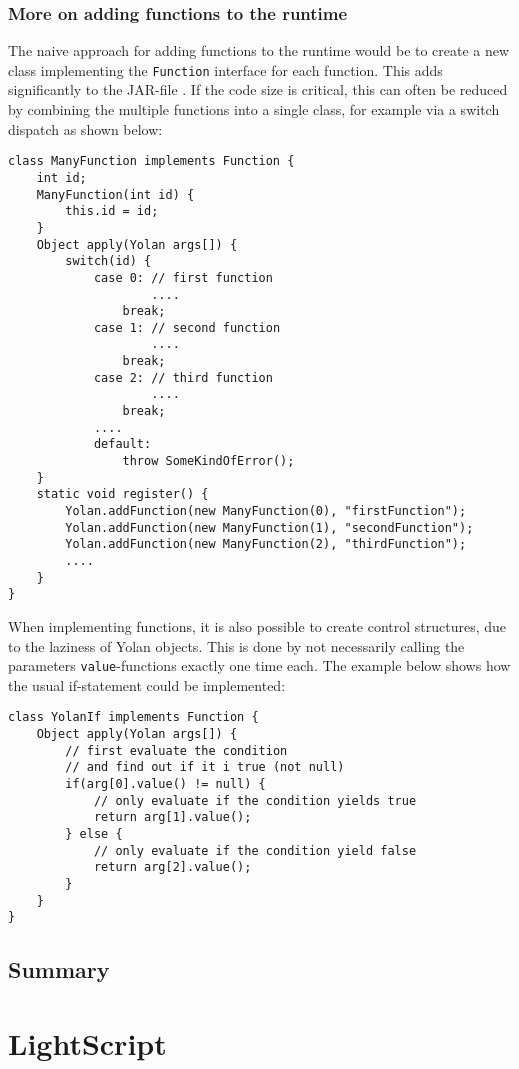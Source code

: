 \documentclass[11pt]{report}
\begin{document}
\subsection{More on adding functions to the runtime}
The naive approach for adding functions to the runtime would be to create a new class implementing the \verb|Function| interface for each function. This adds significantly to the JAR-file
.
If the code size is critical, this can often be reduced by combining the multiple functions into a single class, for example via a switch dispatch as shown below:
\begin{lstlisting}
class ManyFunction implements Function {
    int id;
    ManyFunction(int id) {
        this.id = id;
    }
    Object apply(Yolan args[]) {
        switch(id) {
            case 0: // first function
                    ....
                break;
            case 1: // second function
                    ....
                break;
            case 2: // third function
                    ....
                break;
            ....
            default:
                throw SomeKindOfError();
    }
    static void register() {
        Yolan.addFunction(new ManyFunction(0), "firstFunction");
        Yolan.addFunction(new ManyFunction(1), "secondFunction");
        Yolan.addFunction(new ManyFunction(2), "thirdFunction");
        ....
    }
}
\end{lstlisting}

When implementing functions, it is also possible to create control structures, due to the laziness of Yolan objects. This is done by not necessarily calling the parameters \verb|value|-functions exactly one time each. The example below shows how the usual if-statement could be implemented:
\begin{lstlisting}
class YolanIf implements Function {
    Object apply(Yolan args[]) {
        // first evaluate the condition
        // and find out if it i true (not null)
        if(arg[0].value() != null) {
            // only evaluate if the condition yields true
            return arg[1].value();
        } else {
            // only evaluate if the condition yield false
            return arg[2].value();
        }
    }
}
\end{lstlisting}

\section{Summary}
\chapter{LightScript}
\label{lightscript}
\end{document}
